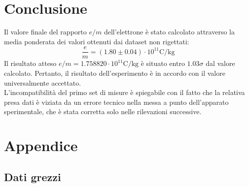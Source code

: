 \documentclass[]{article}
\let\oldsection\section%
\renewcommand{\section}{%
	\renewcommand{\theequation}{\thesection.\arabic{equation}}%
	\oldsection}%
\let\oldsubsection\subsection%
\renewcommand{\subsection}{%
	\renewcommand{\theequation}{\thesubsection.\arabic{equation}}%
	\oldsubsection}%
\begin{document}
    \section{Conclusione}
    Il valore finale del rapporto $e/m$ dell'elettrone è stato calcolato attraverso la media ponderata dei valori ottenuti dai dataset non rigettati:
    \begin{equation}
        \label{final-value}
        \frac{e}{m} = ( 1.80 \pm 0.04) \cdot 10^{11}\text{C/kg} 
    \end{equation}
    Il risultato atteso $e/m = 1.758820 \cdot 10^{11}\text{C/kg}$ è situato entro $1.03\sigma$ dal valore calcolato. Pertanto, il risultato dell'esperimento è in accordo con il valore universalmente accettato. \\
    L'incompatibilità del primo set di misure è spiegabile con il fatto che la relativa presa dati è viziata da un errore tecnico nella messa a punto dell'apparato sperimentale, che è stata corretta solo nelle rilevazioni successive.\\
    

    \newpage
    \section{Appendice}
    \subsection{Dati grezzi}
\end{document}
